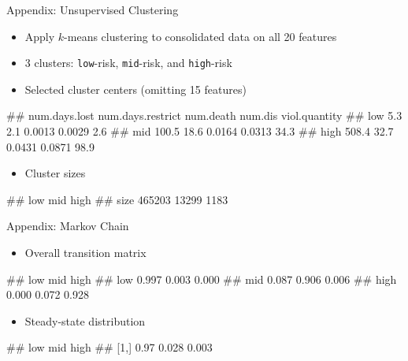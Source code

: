 \documentclass[
]{beamer}
\providecommand{\tightlist}{%
  \setlength{\itemsep}{0pt}\setlength{\parskip}{0pt}}
\let\oldverbatim\verbatim
\let\endoldverbatim\endverbatim
\renewenvironment{verbatim}{\footnotesize\oldverbatim}{\endoldverbatim}
\begin{document}
\begin{frame}[fragile]{Appendix: Unsupervised Clustering}

\begin{itemize}
\tightlist
\item
  Apply \(k\)-means clustering to consolidated data on all 20 features
\item
  3 clusters: \texttt{low}-risk, \texttt{mid}-risk, and
  \texttt{high}-risk
\item
  Selected cluster centers (omitting 15 features)
\end{itemize}

\begin{verbatim}
##      num.days.lost num.days.restrict num.death num.dis viol.quantity
## low            5.3               2.1    0.0013  0.0029           2.6
## mid          100.5              18.6    0.0164  0.0313          34.3
## high         508.4              32.7    0.0431  0.0871          98.9
\end{verbatim}

\begin{itemize}
\tightlist
\item
  Cluster sizes
\end{itemize}

\begin{verbatim}
##         low   mid high
## size 465203 13299 1183
\end{verbatim}

\end{frame}

\begin{frame}[fragile]{Appendix: Markov Chain}

\begin{itemize}
\tightlist
\item
  Overall transition matrix
\end{itemize}

\begin{verbatim}
##        low   mid  high
## low  0.997 0.003 0.000
## mid  0.087 0.906 0.006
## high 0.000 0.072 0.928
\end{verbatim}

\begin{itemize}
\tightlist
\item
  Steady-state distribution
\end{itemize}

\begin{verbatim}
##       low   mid  high
## [1,] 0.97 0.028 0.003
\end{verbatim}

\end{frame}
\end{document}
